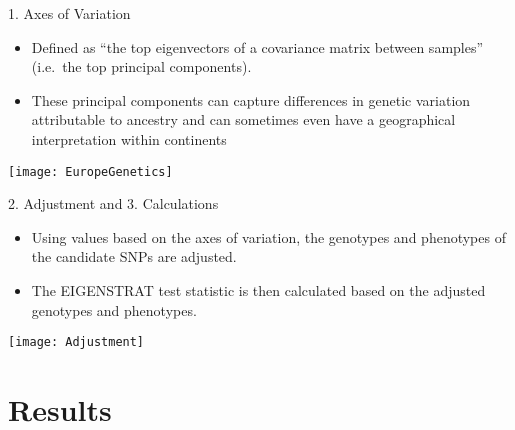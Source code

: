 \documentclass[ignorenonframetext,]{beamer}
\begin{document}
\begin{frame}{1. Axes of Variation}
\protect\hypertarget{axes-of-variation}{}

\begin{itemize}
\item
  Defined as ``the top eigenvectors of a covariance matrix between
  samples'' (i.e.~the top principal components).
\item
  These principal components can capture differences in genetic
  variation attributable to ancestry and can sometimes even have a
  geographical interpretation within continents
\end{itemize}

\begin{center}\texttt{[image: EuropeGenetics]} \end{center}

\end{frame}

\begin{frame}{2. Adjustment and 3. Calculations}
\protect\hypertarget{adjustment-and-3.-calculations}{}

\begin{itemize}
\item
  Using values based on the axes of variation, the genotypes and
  phenotypes of the candidate SNPs are adjusted.
\item
  The EIGENSTRAT test statistic is then calculated based on the adjusted
  genotypes and phenotypes.
\end{itemize}

\begin{center}\texttt{[image: Adjustment]} \end{center}

\end{frame}

\hypertarget{results}{%
\section{Results}\label{results}}
\end{document}
